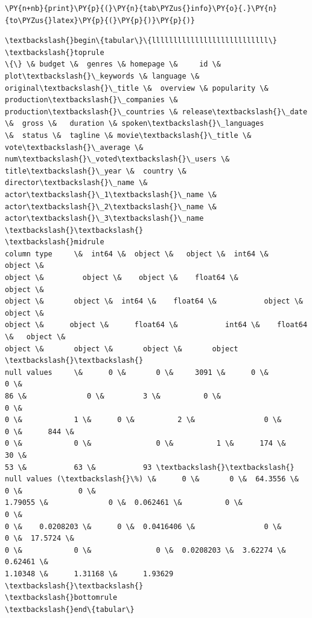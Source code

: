     \begin{tcolorbox}[breakable, size=fbox, boxrule=1pt, pad at break*=1mm,colback=cellbackground, colframe=cellborder]
\begin{Verbatim}[commandchars=\\\{\}]
\PY{n+nb}{print}\PY{p}{(}\PY{n}{tab\PYZus{}info}\PY{o}{.}\PY{n}{to\PYZus{}latex}\PY{p}{(}\PY{p}{)}\PY{p}{)}
\end{Verbatim}
\end{tcolorbox}

    \begin{Verbatim}[commandchars=\\\{\}]
\textbackslash{}begin\{tabular\}\{lllllllllllllllllllllllllll\}
\textbackslash{}toprule
\{\} \& budget \&  genres \& homepage \&     id \& plot\textbackslash{}\_keywords \& language \&
original\textbackslash{}\_title \&  overview \& popularity \& production\textbackslash{}\_companies \&
production\textbackslash{}\_countries \& release\textbackslash{}\_date \&  gross \&   duration \& spoken\textbackslash{}\_languages
\&  status \&  tagline \& movie\textbackslash{}\_title \& vote\textbackslash{}\_average \& num\textbackslash{}\_voted\textbackslash{}\_users \&
title\textbackslash{}\_year \&  country \& director\textbackslash{}\_name \& actor\textbackslash{}\_1\textbackslash{}\_name \& actor\textbackslash{}\_2\textbackslash{}\_name \&
actor\textbackslash{}\_3\textbackslash{}\_name \textbackslash{}\textbackslash{}
\textbackslash{}midrule
column type     \&  int64 \&  object \&   object \&  int64 \&        object \&
object \&         object \&    object \&    float64 \&               object \&
object \&       object \&  int64 \&    float64 \&           object \&  object \&
object \&      object \&      float64 \&           int64 \&    float64 \&   object \&
object \&       object \&       object \&       object \textbackslash{}\textbackslash{}
null values     \&      0 \&       0 \&     3091 \&      0 \&             0 \&
86 \&              0 \&         3 \&          0 \&                    0 \&
0 \&            1 \&      0 \&          2 \&                0 \&       0 \&      844 \&
0 \&            0 \&               0 \&          1 \&      174 \&            30 \&
53 \&           63 \&           93 \textbackslash{}\textbackslash{}
null values (\textbackslash{}\%) \&      0 \&       0 \&  64.3556 \&      0 \&             0 \&
1.79055 \&              0 \&  0.062461 \&          0 \&                    0 \&
0 \&    0.0208203 \&      0 \&  0.0416406 \&                0 \&       0 \&  17.5724 \&
0 \&            0 \&               0 \&  0.0208203 \&  3.62274 \&       0.62461 \&
1.10348 \&      1.31168 \&      1.93629 \textbackslash{}\textbackslash{}
\textbackslash{}bottomrule
\textbackslash{}end\{tabular\}

\end{Verbatim}

